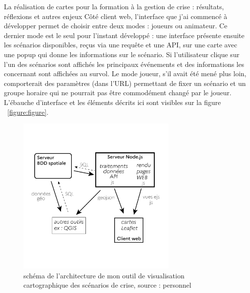 \documentclass[10pt,a4paper]{report} %
\begin{document}
\begin{part}{La réalisation de cartes pour la formation à la gestion de crise : résultats, réflexions et autres enjeux}
Côté client web, l’interface que j’ai commencé à développer permet de choisir entre deux modes : joueurs ou animateur. Ce dernier mode est le seul pour l’instant développé : une interface présente ensuite les scénarios disponibles, reçus via une requête et une API, sur une carte avec une popup qui donne les informations sur le scénario. Si l’utilisateur clique sur l’un des scénarios sont affichés les principaux événements et des informations les concernant sont affichées au survol. Le mode joueur, s’il avait été mené plus loin, comporterait des paramètres (dans l’URL) permettant de fixer un scénario et un groupe horaire qui ne pourrait pas être commodément changé par le joueur. L’ébauche d’interface et les éléments décrits ici sont visibles sur la figure ~\ref{figure:figure}.
\begin{figure}[!b]
    \centering
    \includegraphics[width=0.7\textwidth]{figures/schema_outil.jpg}
    \caption{schéma de l’architecture de mon outil de visualisation cartographique des scénarios de crise, source : personnel}
    \label{fig15}
\end{figure}


\end{part}
\end{document}
